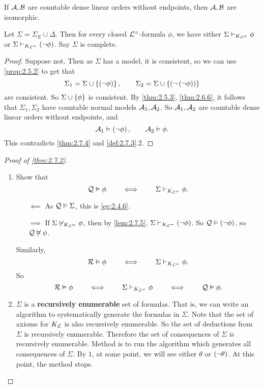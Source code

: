 \begin{theorem}[Cantor]
\label{thm:2.7.4}
If $ \AA, \BB $ are countable dense linear orders without endpoints, then $ \AA, \BB $ are isomorphic.
\end{theorem}

\begin{lemma}
\label{lem:2.7.5}
Let $ \Sigma = \Sigma_E \cup \Delta $. Then for every closed $ \LL^= $-formula $ \phi $, we have either $ \Sigma \vdash_{K_{\LL^=}} \phi $ or $ \Sigma \vdash_{K_{\LL^=}} \notb{\phi} $. Say $ \Sigma $ is complete.
\end{lemma}

\begin{proof}
Suppose not. Then as $ \Sigma $ has a model, it is consistent, so we can use \ref{prop:2.5.2} to get that
$$ \Sigma_1 = \Sigma \cup \cb{\notb{\phi}}, \qquad \Sigma_2 = \Sigma \cup \cb{\notb{\notb{\phi}}} $$
are consistent. So $ \Sigma \cup \cb{\phi} $ is consistent. By \ref{thm:2.5.3}, \ref{thm:2.6.6}, it follows that $ \Sigma_1, \Sigma_2 $ have countable normal models $ \AA_1, \AA_2 $. So $ \AA_1, \AA_2 $ are countable dense linear orders without endpoints, and
$$ \AA_1 \vDash \notb{\phi}, \qquad \AA_2 \vDash \phi. $$
This contradicts \ref{thm:2.7.4} and \ref{def:2.7.3}.$ 2 $.
\end{proof}

\begin{proof}[Proof of \ref{thm:2.7.2}]
\hfill
\begin{enumerate}
\item Show that
$$ \QQ \vDash \phi \qquad \iff \qquad \Sigma \vdash_{K_{\LL^=}} \phi. $$
\begin{itemize}
\item[$ \impliedby $] As $ \QQ \vDash \Sigma $, this is \ref{eg:2.4.6}.
\item[$ \implies $] If $ \Sigma \not\vdash_{K_{\LL^=}} \phi $, then by \ref{lem:2.7.5}, $ \Sigma \vdash_{K_{\LL^=}} \notb{\phi} $. So $ \QQ \vDash \notb{\phi} $, so $ \QQ \not\vDash \phi $.
\end{itemize}
Similarly,
$$ \RR \vDash \phi \qquad \iff \qquad \Sigma \vdash_{K_{\LL^=}} \phi. $$
So
$$ \RR \vDash \phi \qquad \iff \qquad \Sigma \vdash_{K_{\LL^=}} \phi \qquad \iff \qquad \QQ \vDash \phi. $$
\item $ \Sigma $ is a \textbf{recursively enumerable} set of formulas. That is, we can write an algorithm to systematically generate the formulas in $ \Sigma $. Note that the set of axioms for $ K_\LL $ is also recursively enumerable. So the set of deductions from $ \Sigma $ is recursively enumerable. Therefore the set of consequences of $ \Sigma $ is recursively enumerable. Method is to run the algorithm which generates all consequences of $ \Sigma $. By $ 1 $, at some point, we will see either $ \theta $ or $ \notb{\theta} $. At this point, the method stops.
\end{enumerate}
\end{proof}

